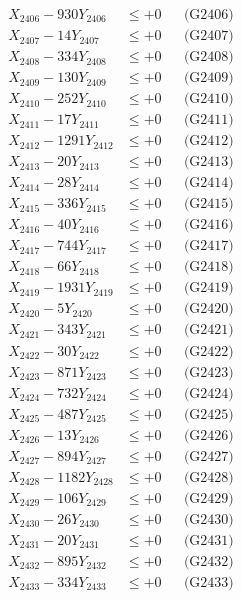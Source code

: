 \documentclass[a4paper,10pt]{article}
\begin{document}
{\begin{align}
X_{2406} - 930Y_{2406} &\leq +0 && \text{(G2406)} \\
X_{2407} - 14Y_{2407} &\leq +0 && \text{(G2407)} \\
X_{2408} - 334Y_{2408} &\leq +0 && \text{(G2408)} \\
X_{2409} - 130Y_{2409} &\leq +0 && \text{(G2409)} \\
X_{2410} - 252Y_{2410} &\leq +0 && \text{(G2410)} \\
\allowbreak
X_{2411} - 17Y_{2411} &\leq +0 && \text{(G2411)} \\
X_{2412} - 1291Y_{2412} &\leq +0 && \text{(G2412)} \\
X_{2413} - 20Y_{2413} &\leq +0 && \text{(G2413)} \\
X_{2414} - 28Y_{2414} &\leq +0 && \text{(G2414)} \\
X_{2415} - 336Y_{2415} &\leq +0 && \text{(G2415)} \\
X_{2416} - 40Y_{2416} &\leq +0 && \text{(G2416)} \\
X_{2417} - 744Y_{2417} &\leq +0 && \text{(G2417)} \\
X_{2418} - 66Y_{2418} &\leq +0 && \text{(G2418)} \\
X_{2419} - 1931Y_{2419} &\leq +0 && \text{(G2419)} \\
X_{2420} - 5Y_{2420} &\leq +0 && \text{(G2420)} \\
\allowbreak
X_{2421} - 343Y_{2421} &\leq +0 && \text{(G2421)} \\
X_{2422} - 30Y_{2422} &\leq +0 && \text{(G2422)} \\
X_{2423} - 871Y_{2423} &\leq +0 && \text{(G2423)} \\
X_{2424} - 732Y_{2424} &\leq +0 && \text{(G2424)} \\
X_{2425} - 487Y_{2425} &\leq +0 && \text{(G2425)} \\
X_{2426} - 13Y_{2426} &\leq +0 && \text{(G2426)} \\
X_{2427} - 894Y_{2427} &\leq +0 && \text{(G2427)} \\
X_{2428} - 1182Y_{2428} &\leq +0 && \text{(G2428)} \\
X_{2429} - 106Y_{2429} &\leq +0 && \text{(G2429)} \\
X_{2430} - 26Y_{2430} &\leq +0 && \text{(G2430)} \\
\allowbreak
X_{2431} - 20Y_{2431} &\leq +0 && \text{(G2431)} \\
X_{2432} - 895Y_{2432} &\leq +0 && \text{(G2432)} \\
X_{2433} - 334Y_{2433} &\leq +0 && \text{(G2433)} \\

\end{align}}
\end{document}
